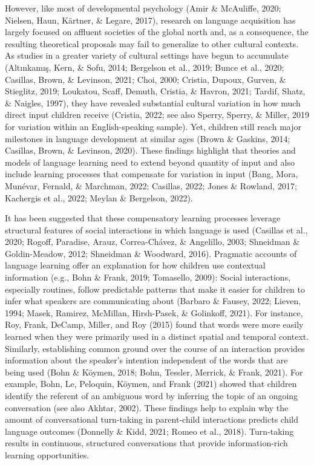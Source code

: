 \documentclass[
  man,floatsintext]{apa6}
\begin{document}
However, like most of developmental psychology (Amir \& McAuliffe, 2020; Nielsen, Haun, Kärtner, \& Legare, 2017), research on language acquisition has largely focused on affluent societies of the global north and, as a consequence, the resulting theoretical proposals may fail to generalize to other cultural contexts. As studies in a greater variety of cultural settings have begun to accumulate (Altınkamış, Kern, \& Sofu, 2014; Bergelson et al., 2019; Bunce et al., 2020; Casillas, Brown, \& Levinson, 2021; Choi, 2000; Cristia, Dupoux, Gurven, \& Stieglitz, 2019; Loukatou, Scaff, Demuth, Cristia, \& Havron, 2021; Tardif, Shatz, \& Naigles, 1997), they have revealed substantial cultural variation in how much direct input children receive (Cristia, 2022; see also Sperry, Sperry, \& Miller, 2019 for variation within an English-speaking sample). Yet, children still reach major milestones in language development at similar ages (Brown \& Gaskins, 2014; Casillas, Brown, \& Levinson, 2020). These findings highlight that theories and models of language learning need to extend beyond quantity of input and also include learning processes that compensate for variation in input (Bang, Mora, Munévar, Fernald, \& Marchman, 2022; Casillas, 2022; Jones \& Rowland, 2017; Kachergis et al., 2022; Meylan \& Bergelson, 2022).

It has been suggested that these compensatory learning processes leverage structural features of social interactions in which language is used (Casillas et al., 2020; Rogoff, Paradise, Arauz, Correa-Chávez, \& Angelillo, 2003; Shneidman \& Goldin-Meadow, 2012; Shneidman \& Woodward, 2016). Pragmatic accounts of language learning offer an explanation for how children use contextual information (e.g., Bohn \& Frank, 2019; Tomasello, 2009): Social interactions, especially routines, follow predictable patterns that make it easier for children to infer what speakers are communicating about (Barbaro \& Fausey, 2022; Lieven, 1994; Masek, Ramirez, McMillan, Hirsh-Pasek, \& Golinkoff, 2021). For instance, Roy, Frank, DeCamp, Miller, and Roy (2015) found that words were more easily learned when they were primarily used in a distinct spatial and temporal context. Similarly, establishing common ground over the course of an interaction provides information about the speaker's intention independent of the words that are being used (Bohn \& Köymen, 2018; Bohn, Tessler, Merrick, \& Frank, 2021). For example, Bohn, Le, Peloquin, Köymen, and Frank (2021) showed that children identify the referent of an ambiguous word by inferring the topic of an ongoing conversation (see also Akhtar, 2002). These findings help to explain why the amount of conversational turn-taking in parent-child interactions predicts child language outcomes (Donnelly \& Kidd, 2021; Romeo et al., 2018). Turn-taking results in continuous, structured conversations that provide information-rich learning opportunities.
\end{document}
